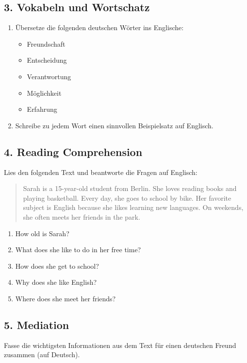 \subsection*{3. Vokabeln und Wortschatz}
\begin{enumerate}
    \item Übersetze die folgenden deutschen Wörter ins Englische:
    \begin{itemize}
        \item Freundschaft
        \item Entscheidung
        \item Verantwortung
        \item Möglichkeit
        \item Erfahrung
    \end{itemize}
    \item Schreibe zu jedem Wort einen sinnvollen Beispielsatz auf Englisch.
\end{enumerate}

\subsection*{4. Reading Comprehension}
Lies den folgenden Text und beantworte die Fragen auf Englisch:

\begin{quote}
Sarah is a 15-year-old student from Berlin. She loves reading books and playing basketball. Every day, she goes to school by bike. Her favorite subject is English because she likes learning new languages. On weekends, she often meets her friends in the park.
\end{quote}

\begin{enumerate}
    \item How old is Sarah?
    \item What does she like to do in her free time?
    \item How does she get to school?
    \item Why does she like English?
    \item Where does she meet her friends?
\end{enumerate}

\subsection*{5. Mediation}
Fasse die wichtigsten Informationen aus dem Text für einen deutschen Freund zusammen (auf Deutsch).

